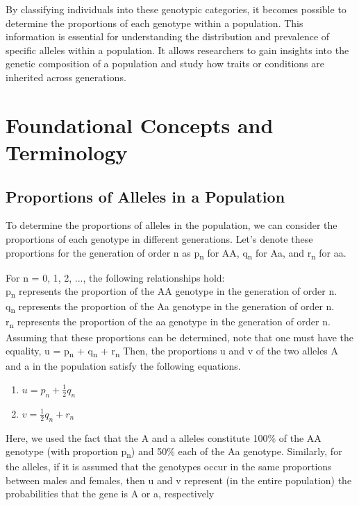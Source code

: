 \documentclass[a4paper,12pt]{article}
\begin{document}
By classifying individuals into these genotypic categories, it becomes possible to determine the proportions of each genotype within a population. This information is essential for understanding the distribution and prevalence of specific alleles within a population. It allows researchers to gain insights into the genetic composition of a population and study how traits or conditions are inherited across generations.
\section{Foundational Concepts and Terminology}
\subsection{Proportions of Alleles in a Population}
To determine the proportions of alleles in the population, we can consider the proportions of each genotype in different generations. Let's denote these proportions for the generation of order n as p\textsubscript{n} for AA, q\textsubscript{n} for Aa, and r\textsubscript{n} for aa.

For n = 0, 1, 2, ..., the following relationships hold:\ \\
p\textsubscript{n} represents the proportion of the AA genotype in the generation of order n.\ \\
q\textsubscript{n} represents the proportion of the Aa genotype in the generation of order n.\ \\
r\textsubscript{n} represents the proportion of the aa genotype in the generation of order n.\ \\

Assuming that these proportions can be determined, note that one must have the equality, u = p\textsubscript{n} + q\textsubscript{n} + r\textsubscript{n} Then, the proportions u and v of the two alleles A and a in the population satisfy the following equations.

\begin{enumerate}
\item \( u = p_{n} + \frac{1}{2}q_{n} \)
\item \( v = \frac{1}{2}q_{n} + r_{n} \)
\end{enumerate}
Here, we used the fact that the A and a alleles constitute 100\% of the AA genotype (with proportion p\textsubscript{n}) and 50\% each of the Aa genotype. Similarly, for the alleles, if it is assumed that the genotypes occur in the same proportions between males and females, then u and v represent (in the entire population) the probabilities that the gene is A or a, respectively
\end{document}

